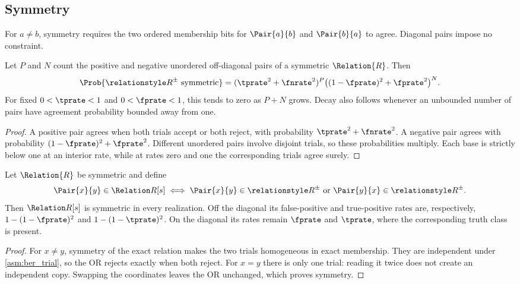 \documentclass[ ../main.tex]{subfiles}
\begin{document}
\subsection{Symmetry}
\label{sec:symmetric}
For $a\ne b$, symmetry requires the two ordered membership bits for
$\Pair{a}{b}$ and $\Pair{b}{a}$ to agree. Diagonal pairs impose no constraint.

\begin{theorem}
\label{thm:symmetric_preservation}
Let $P$ and $N$ count the positive and negative unordered off-diagonal pairs of
a symmetric $\Relation{R}$. Then
\begin{equation}
  \Prob{\ARelation{R}\text{ symmetric}}
  =(\tprate^2+\fnrate^2)^P
   \bigl((1-\fprate)^2+\fprate^2\bigr)^N.
\end{equation}
For fixed $0<\tprate<1$ and $0<\fprate<1$, this tends to zero as $P+N$ grows.
Decay also follows whenever an unbounded number of pairs have agreement
probability bounded away from one.
\end{theorem}
\begin{proof}
A positive pair agrees when both trials accept or both reject, with probability
$\tprate^2+\fnrate^2$. A negative pair agrees with probability
$(1-\fprate)^2+\fprate^2$. Different unordered pairs involve disjoint trials,
so these probabilities multiply. Each base is strictly below one at an interior
rate, while at rates zero and one the corresponding trials agree surely.
\end{proof}

\begin{theorem}
\label{thm:symmetric_closure}
Let $\Relation{R}$ be symmetric and define
\begin{equation}
  \Pair{x}{y}\in\ARelation{R}[s]
  \iff \Pair{x}{y}\in\ARelation{R}
        \text{ or }\Pair{y}{x}\in\ARelation{R}.
\end{equation}
Then $\ARelation{R}[s]$ is symmetric in every realization. Off the diagonal its
false-positive and true-positive rates are, respectively,
$1-(1-\fprate)^2$ and $1-(1-\tprate)^2$. On the diagonal its rates remain
$\fprate$ and $\tprate$, where the corresponding truth class is present.
\end{theorem}
\begin{proof}
For $x\ne y$, symmetry of the exact relation makes the two trials homogeneous
in exact membership. They are independent under \cref{asm:ber_trial}, so the
OR rejects exactly when both reject. For $x=y$ there is only one trial: reading
it twice does not create an independent copy. Swapping the coordinates leaves
the OR unchanged, which proves symmetry.
\end{proof}
\end{document}
